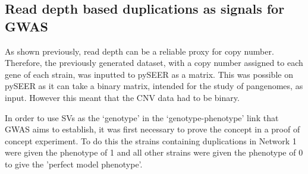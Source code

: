 \documentclass{article}
\begin{document}
\subsection{Read depth based duplications as signals for GWAS}

As shown previously, read depth can be a reliable proxy for copy number. Therefore, the previously generated dataset, with a copy number assigned to each gene of each strain, was inputted to pySEER as a matrix. This was possible on pySEER as it can take a binary matrix, intended for the study of pangenomes, as input. However this meant that the CNV data had to be binary.


In order to use SVs as the ‘genotype’ in the ‘genotype-phenotype’ link that GWAS aims to establish, it was first necessary to prove the concept in a proof of concept experiment. To do this the strains containing duplications in Network 1 were given the phenotype of 1 and all other strains were given the phenotype of 0 to give the 'perfect model phenotype'.




\end{document}
